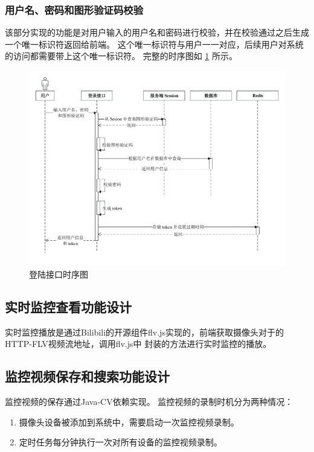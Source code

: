 \newpage
\subsubsection{用户名、密码和图形验证码校验}
该部分实现的功能是对用户输入的用户名和密码进行校验，并在校验通过之后生成一个唯一标识符返回给前端。
这个唯一标识符与用户一一对应，后续用户对系统的访问都需要带上这个唯一标识符。
完整的时序图如 \ref{Fig:login_seq} 所示。

\begin{figure}[ht]
    \centering
    \includegraphics[width=1\linewidth]{./Figure/IMG_login_seq.pdf}
    \caption{登陆接口时序图}\label{Fig:login_seq}
\end{figure}

\subsection{实时监控查看功能设计}
实时监控播放是通过Bilibili的开源组件flv.js实现的，前端获取摄像头对于的HTTP-FLV视频流地址，调用flv.js中
封装的方法进行实时监控的播放。

\subsection{监控视频保存和搜索功能设计}
监控视频的保存通过Java-CV依赖实现。
监控视频的录制时机分为两种情况：

\begin{enumerate}
    \item 摄像头设备被添加到系统中，需要启动一次监控视频录制。
    \item 定时任务每分钟执行一次对所有设备的监控视频录制。
\end{enumerate}

